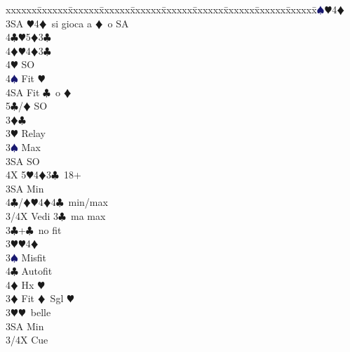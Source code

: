 \documentclass[a4paper,italian]{article}
\newcommand{\BC}{\textcolor{OliveGreen}{$\clubsuit$}}
\newcommand{\BD}{\textcolor{RedOrange}{$\vardiamondsuit$}}
\newcommand{\BH}{\textcolor{Red2}{$\varheartsuit${}}}
\newcommand{\BS}{\textcolor{MidnightBlue}{$\spadesuit${}}}
\newenvironment{bidtable}
{\begin{tabbing}

    xxxxxx\=xxxxxx\=xxxxxx\=xxxxxx\=xxxxxx\=xxxxxx\=xxxxxx\=xxxxxx\=xxxxxx\=xxxxxx\=\kill}
{\end{tabbing} }%
\begin{document}
\begin{multicols}{2}
\begin{bidtable}
                                            3\BS {}\BH 4\BD \\
                                            3SA \BH 4\BD\ si gioca a \BD\ o SA\\
                                            4\BC {}\BH 5\BD 3\BC \\
                                            4\BD {}\BH 4\BD 3\BC \+\\
                                            4\BH \> SO\\
                                            4\BS \> Fit \BH \\
                                            4SA \> Fit \BC\ o \BD \\
                                            5\BC/\BD \> SO\-\-\-\\
                                            3\BD {}\BC \+\\
                                            3\BH \> Relay\+\\
                                            3\BS \> Max\+\\
                                            3SA \> SO\+\\
                                            4X 5\BH 4\BD 3\BC\ 18+\-\-\\
                                            3SA \> Min\\
                                            4\BC/\BD {}\BH 4\BD 4\BC\ min/max\-\-\\
                                            3/4X \> Vedi 3\BC\ ma max\-\\
                                            3\BC {}+\BC\ no fit\+\\
                                            3\BH {}\BH 4\BD \+\\
                                            3\BS \> Misfit\\
                                            4\BC \> Autofit\\
                                            4\BD \> Hx \BH \-\-\\
                                            3\BD \> Fit \BD\ Sgl \BH \+\\
                                            3\BH {}\BH\ belle\\
                                            3SA \> Min\\
                                            3/4X \> Cue\-\\

\end{bidtable}
\end{multicols}
\end{document}
